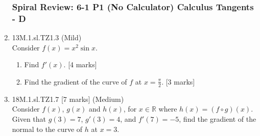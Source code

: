 \documentclass[12pt, twoside]{article}
\begin{document}
\begin{enumerate}
\newpage
\setcounter{enumi}{0}
\subsubsection*{Spiral Review: 6-1 P1 (No Calculator) Calculus Tangents - D}

  \item 13M.1.sl.TZ1.3 (Mild)\\
  Consider $f(x)=x^2 \sin x$.
  \begin{enumerate}
    \item Find $f'(x)$. [4 marks]
    \item Find the gradient of the curve of $f$ at $x= \frac{\pi}{2}$. [3 marks]
  \end{enumerate}

  \item 18M.1.sl.TZ1.7 [7 marks] (Medium)\\
  Consider $f(x)$, $g(x)$ and $h(x)$, for $x \in \mathbb{R}$ where $h(x)=(f \circ g)(x)$.\\
  Given that $g(3)=7$, $g'(3)=4$, and $f'(7)=-5$, find the gradient of the normal to the curve of $h$ at $x=3$.


\end{enumerate}
\end{document}

